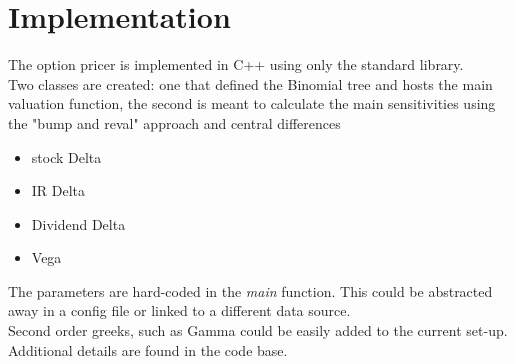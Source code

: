 \documentclass{article}
\begin{document}
\section{Implementation}
The option pricer is implemented in C++ using only the standard library.\\
Two classes are created: one that defined the Binomial tree and hosts the main valuation function, the second is meant to calculate the main sensitivities using the "bump and reval" approach and central differences 
\begin{itemize}
    \item stock Delta
    \item IR Delta
    \item Dividend Delta
    \item Vega
\end{itemize}
The parameters are hard-coded in the \emph{main} function. This could be abstracted away in a config file or linked to a different data source.\\
Second order greeks, such as Gamma could be easily added to the current set-up.\\
Additional details are found in the code base.
\end{document}
